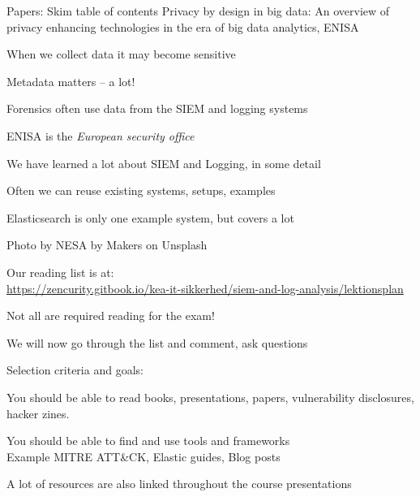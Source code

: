 \documentclass[Screen16to9,17pt]{foils}
\begin{document}

\begin{quote}

\end{quote}

\begin{list1}
\item Papers: Skim table of contents Privacy by design in big data: An overview of privacy enhancing technologies in the era of big data analytics, ENISA
\begin{list2}
\item When we collect data it may become sensitive
\item Metadata matters -- a lot!
\item Forensics often use data from the SIEM and logging systems
\item ENISA is the \emph{European security office}
\end{list2}
\end{list1}




\begin{list1}
\item We have learned a lot about SIEM and Logging, in some detail
\item Often we can reuse existing systems, setups, examples
\item Elasticsearch is only one example system, but covers a lot
\item Photo by NESA by Makers on Unsplash
\end{list1}



\begin{list1}
\item Our reading list is at:\\
{\footnotesize\url{https://zencurity.gitbook.io/kea-it-sikkerhed/siem-and-log-analysis/lektionsplan}}
\item Not all are required reading for the exam!
\item We will now go through the list and comment, ask questions
\item Selection criteria and goals:
\begin{list2}
\item You should be able to read books, presentations, papers, vulnerability disclosures, hacker zines.
\item You should be able to find and use tools and frameworks\\
Example MITRE ATT\&CK, Elastic guides, Blog posts
\end{list2}
\item A lot of resources are also linked throughout the course presentations
\end{list1}
\end{document}
